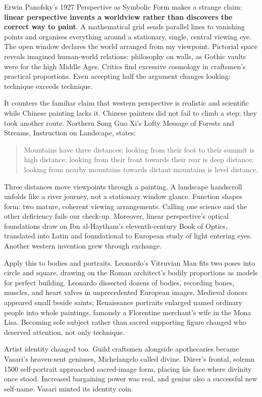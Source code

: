 Erwin Panofsky's 1927 Perspective as Symbolic Form makes a strange claim: \textbf{linear perspective invents a worldview rather than discovers the correct way to paint}. A mathematical grid sends parallel lines to vanishing points and organises everything around a stationary, single, central viewing eye. The open window declares the world arranged from my viewpoint. Pictorial space reveals imagined human-world relations: philosophy on walls, as Gothic vaults were for the high Middle Ages. Critics find excessive cosmology in craftsmen's practical proportions. Even accepting half the argument changes looking: technique exceeds technique.

It counters the familiar claim that western perspective is realistic and scientific while Chinese painting lacks it. Chinese painters did not fail to climb a step; they took another route. Northern Song Guo Xi's Lofty Message of Forests and Streams, Instruction on Landscape, states:

\begin{quote}
Mountains have three distances: looking from their foot to their summit is high distance; looking from their front towards their rear is deep distance; looking from nearby mountains towards distant mountains is level distance.
\end{quote}
Three distances move viewpoints through a painting. A landscape handscroll unfolds like a river journey, not a stationary window glance. Function shapes form: two mature, coherent viewing arrangements. Calling one science and the other deficiency fails our check-up. Moreover, linear perspective's optical foundations draw on Ibn al-Haytham's eleventh-century Book of Optics, translated into Latin and foundational to European study of light entering eyes. Another western invention grew through exchange.

Apply this to bodies and portraits. Leonardo's Vitruvian Man fits two poses into circle and square, drawing on the Roman architect's bodily proportions as models for perfect building. Leonardo dissected dozens of bodies, recording bones, muscles, and heart valves in unprecedented European images. Medieval donors appeared small beside saints; Renaissance portraits enlarged named ordinary people into whole paintings, famously a Florentine merchant's wife in the Mona Lisa. Becoming sole subject rather than sacred supporting figure changed who deserved attention, not only technique.

Artist identity changed too. Guild craftsmen alongside apothecaries became Vasari's heaven-sent geniuses, Michelangelo called divine. Dürer's frontal, solemn 1500 self-portrait approached sacred-image form, placing his face where divinity once stood. Increased bargaining power was real, and genius also a successful new self-name. Vasari minted its identity coin.

